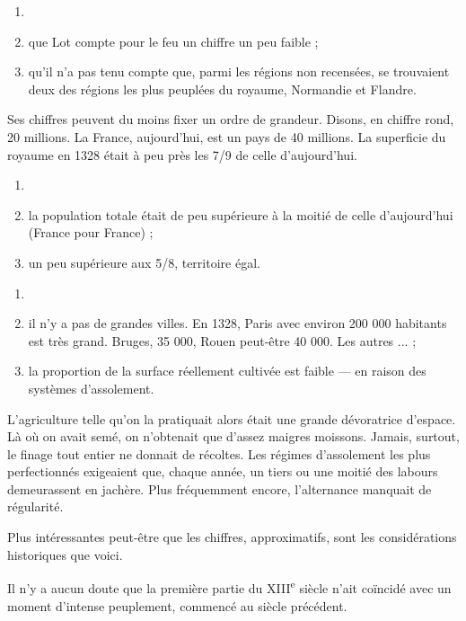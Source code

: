 \documentclass[french,twoside]{book} %
\begin{document}
\begin{enumerate}[itemsep=0pt,]
\item[] \hspace{-1.5em}{\bfseries Je crois :}
\item que Lot compte pour le feu un chiffre un peu faible ;
\item qu’il n’a pas tenu compte que, parmi les régions non recensées, se trouvaient deux des régions les plus peuplées du royaume, Normandie et Flandre.

\end{enumerate}\noindent Ses chiffres peuvent du moins fixer un ordre de grandeur. Disons, en chiffre rond, 20 millions. La France, aujourd’hui, est un pays de 40 millions. La superficie du royaume en 1328 était à peu près les 7/9 de celle d’aujourd’hui.\par

\begin{enumerate}[itemsep=0pt,]
\item[] \hspace{-1.5em}{\bfseries En gros :}
\item la population totale était de peu supérieure à la moitié de celle d’aujourd’hui (France pour France) ;
\item un peu supérieure aux 5/8, territoire égal.

\end{enumerate} 
\label{p9}
\begin{enumerate}[itemsep=0pt,]
\item[] \hspace{-1.5em}{\bfseries Explication de ces différences :}
\item il n’y a pas de grandes villes. En 1328, Paris avec environ 200 000 habitants est très grand. Bruges, 35 000, Rouen peut-être 40 000. Les autres ... ;
\item la proportion de la surface réellement cultivée est faible — en raison des systèmes d’assolement.

\end{enumerate}\noindent L’agriculture telle qu’on la pratiquait alors était une grande dévoratrice d’espace. Là où on avait semé, on n’obtenait que d’assez maigres moissons. Jamais, surtout, le finage tout entier ne donnait de récoltes. Les régimes d’assolement les plus perfectionnés exigeaient que, chaque année, un tiers ou une moitié des labours demeurassent en jachère. Plus fréquemment encore, l’alternance manquait de régularité.\par
Plus intéressantes peut-être que les chiffres, approximatifs, sont les considérations historiques que voici.\par
Il n’y a aucun doute que la première partie du XIII\textsuperscript{e} siècle n’ait coïncidé avec un moment d’intense peuplement, commencé au siècle précédent.\par
\end{document}
